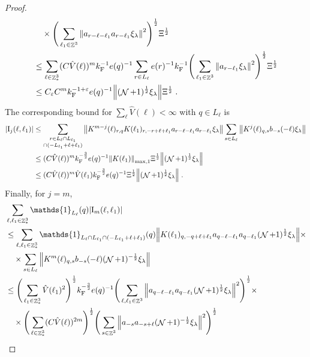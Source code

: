 \documentclass[12pt,a4paper]{article}
\numberwithin{equation}{section}
\newcommand{\1}{\mathbb{I}}
\newcommand{\F}{\mathrm{F}}
\newcommand{\I}{\mathrm{I}}
\DeclareMathOperator{\Z}{\mathbb{Z}}
\DeclareMathOperator{\NN}{\mathcal{N}}
\newcommand{\half}{\frac{1}{2}}
\theoremstyle{plain}
\theoremstyle{definition}
\theoremstyle{remark}
\theoremstyle{plain}
\theoremstyle{definition}
\theoremstyle{remark}
\begin{document}
\begin{proof}
{\begin{align}
	&\quad \times \Bigg( \sum_{\ell_1 \in \Z^3} \norm{ a_{r-\ell-\ell_1} a_{r-\ell_1} \xi_\lambda}^2 \Bigg)^{\half}
		\Xi^\half \nonumber\\
	&\leq \sum_{\ell \in \Z^3_*} (C \hat{V}(\ell))^m k_{\F}^{-1} e(q)^{-1}
		\sum_{r \in L_\ell} e(r)^{-1} k_{\F}^{-1}
		\Bigg( \sum_{\ell_1 \in \Z^3} \norm{ a_{r-\ell_1} \xi_\lambda}^2 \Bigg)^{\half}
		\Xi^\half \nonumber\\
	&\leq C_\varepsilon C^m k_{\F}^{-1+\varepsilon} e(q)^{-1}
		\norm{ (\NN+1)^{\half} \xi_\lambda}
		\Xi^\half \;. \label{eq:estEQ2152_Coulomb}
\end{align}
The corresponding bound for $ \sum_\ell \hat{V}(\ell) < \infty $ with $ q \in L_\ell $ is}
\begin{align}
	|\I_j(\ell, \ell_1)|
	&\leq \sum\limits_{\substack{r\in L_{\ell} \cap L_{\ell_1}\\ \cap (-L_{\ell_1}+\ell+\ell_1)}}
		\norm{ K^{m-j}(\ell)_{r,q} K(\ell_1)_{r,-r+\ell+\ell_1} a_{r-\ell-\ell_1} a_{r-\ell_1} \xi_\lambda}
		\sum\limits_{s \in L_{\ell}}
		\norm{ K^j(\ell)_{q,s} b_{-s}(-\ell) \xi_\lambda }\nonumber\\
	&\leq (C \hat{V}(\ell))^m k_{\F}^{-\frac 32} e(q)^{-1}
		\norm{K(\ell_1)}_{\max,1} \Xi^{\half}
		\norm{ (\NN+1)^\half \xi_\lambda} \nonumber\\
	&\leq (C \hat{V}(\ell))^m
		\hat{V}(\ell_1)
		k_{\F}^{-\frac 32} e(q)^{-1} \Xi^\half
		\norm{ (\NN+1)^\half \xi_\lambda} \;. \label{eq:estEQ2152}
\end{align}
Finally, for $ j = m $,
\textcolor{green!30!black}{
\begin{align}
	&\sum_{\ell,\ell_1 \in \Z^3_*} \mathds{1}_{L_\ell}(q) |\I_m(\ell, \ell_1)| \nonumber\\
	&\leq \sum_{\ell,\ell_1 \in \Z^3_*} \mathds{1}_{L_\ell \cap L_{\ell_1} \cap (-L_{\ell_1} + \ell + \ell_1)}(q) \norm{K(\ell_1)_{q,-q+\ell+\ell_1} a_{q-\ell-\ell_1} a_{q-\ell_1} (\NN+1)^{\half} \xi_\lambda} \times \nonumber\\
	&\quad \times \sum\limits_{ s \in L_{\ell}}
		\norm{ K^m(\ell)_{q,s} b_{-s}(-\ell) (\NN+1)^{-\half} \xi_\lambda }\nonumber\\
	&\leq \Bigg( \sum_{\ell_1 \in \Z^3_*} \hat{V}(\ell_1)^2 \Bigg)^{\half} 
		k_{\F}^{-\frac 32} e(q)^{-1}
		\Bigg( \sum_{\ell,\ell_1 \in \Z^3} \norm{a_{q-\ell-\ell_1} a_{q-\ell_1} (\NN+1)^{\half} \xi_\lambda}^2 \Bigg)^{\half} \times \nonumber\\
	&\quad \times \Bigg( \sum_{\ell \in \Z^3_*} (C \hat{V}(\ell))^{2m} \Bigg)^{\half} 
		\Bigg( \sum\limits_{ s \in \Z^3} \norm{ a_{-s} a_{-s+\ell} (\NN+1)^{-\half} \xi_\lambda }^2 \Bigg)^{\half} \nonumber\\

\end{align}}
\end{proof}
\end{document}

